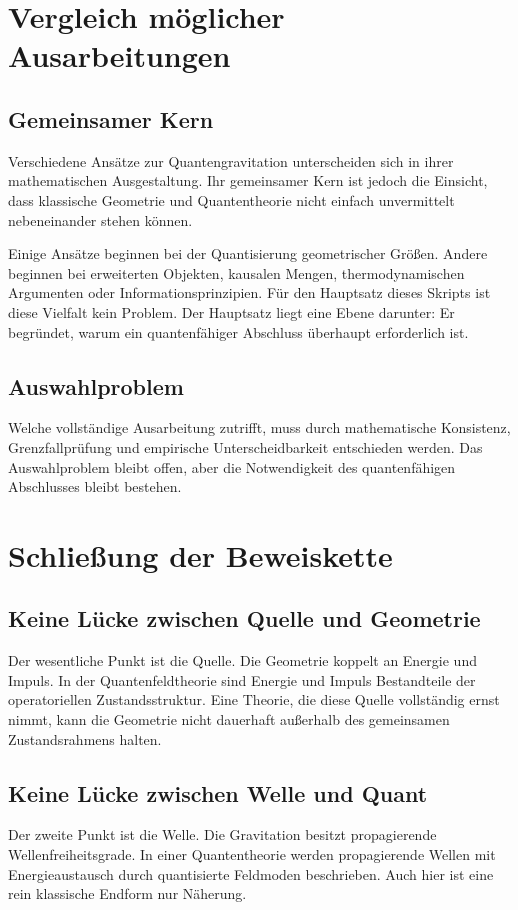 \documentclass[11pt,a4paper,openany]{book}
\theoremstyle{remark}
\begin{document}
\chapter{Vergleich möglicher Ausarbeitungen}
\section{Gemeinsamer Kern}
Verschiedene Ansätze zur Quantengravitation unterscheiden sich in ihrer mathematischen Ausgestaltung. Ihr gemeinsamer Kern ist jedoch die Einsicht, dass klassische Geometrie und Quantentheorie nicht einfach unvermittelt nebeneinander stehen können.

Einige Ansätze beginnen bei der Quantisierung geometrischer Größen. Andere beginnen bei erweiterten Objekten, kausalen Mengen, thermodynamischen Argumenten oder Informationsprinzipien. Für den Hauptsatz dieses Skripts ist diese Vielfalt kein Problem. Der Hauptsatz liegt eine Ebene darunter: Er begründet, warum ein quantenfähiger Abschluss überhaupt erforderlich ist.

\section{Auswahlproblem}
Welche vollständige Ausarbeitung zutrifft, muss durch mathematische Konsistenz, Grenzfallprüfung und empirische Unterscheidbarkeit entschieden werden. Das Auswahlproblem bleibt offen, aber die Notwendigkeit des quantenfähigen Abschlusses bleibt bestehen.

\chapter{Schließung der Beweiskette}
\section{Keine Lücke zwischen Quelle und Geometrie}
Der wesentliche Punkt ist die Quelle. Die Geometrie koppelt an Energie und Impuls. In der Quantenfeldtheorie sind Energie und Impuls Bestandteile der operatoriellen Zustandsstruktur. Eine Theorie, die diese Quelle vollständig ernst nimmt, kann die Geometrie nicht dauerhaft außerhalb des gemeinsamen Zustandsrahmens halten.

\section{Keine Lücke zwischen Welle und Quant}
Der zweite Punkt ist die Welle. Die Gravitation besitzt propagierende Wellenfreiheitsgrade. In einer Quantentheorie werden propagierende Wellen mit Energieaustausch durch quantisierte Feldmoden beschrieben. Auch hier ist eine rein klassische Endform nur Näherung.
\end{document}
